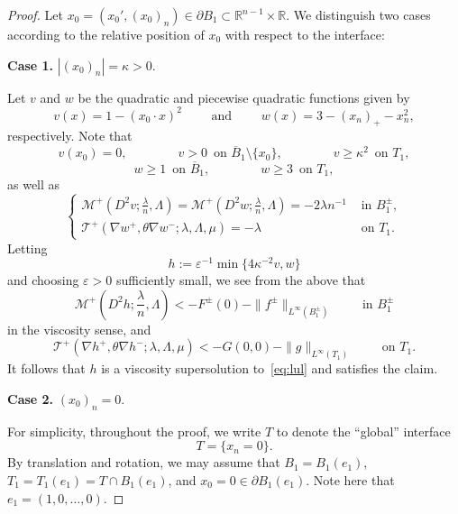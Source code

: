 \documentclass[letter,11pt]{amsart}
\newcommand{\R}{\mathbb{R}}
\newcommand{\vep}{\varepsilon}
\newcommand{\mcal}{\mathcal{M}}
\newcommand{\tcal}{\mathcal{T}}
\theoremstyle{definition}
\numberwithin{equation}{section}
\begin{document}
\begin{proof}
Let $x_0 = (x_0', (x_0)_n) \in \partial B_1 \subset \R^{n-1} \times \R$.
We distinguish two cases according to the relative position of $x_0$ with respect to the interface:

\medskip

\noindent
\textbf{Case 1.} $|(x_0)_n| = \kappa > 0$.

\medskip

Let $v$ and $w$ be the quadratic and piecewise quadratic functions given by
\[
v(x) = 1- (x_0 \cdot x)^2
\qquad \text{ and } 
\qquad w(x) = 3 - (x_n)_{+} - x_n^2,
\]
respectively.
Note that 
\[
v(x_0) = 0,  
\qquad\qquad v > 0 \, \text{ on } \overline{B}_1 \setminus \{x_0\},  
\qquad\qquad v \geq \kappa^2 \, \text{ on } T_1,
\]
\[
w \geq 1 \, \text{ on } \overline{B}_1, \qquad\qquad w \geq 3 \, \text{ on } T_1,
\]
as well as
\[
\begin{cases}
\textstyle
\mcal^{+}(D^2 v; \frac{\lambda}{n}, \Lambda) 
= \mcal^{+}(D^2 w; \frac{\lambda}{n}, \Lambda)
= - 2 \lambda n^{-1} & \text{ in } B_1^{\pm},\\
\tcal^{+}(\nabla w^{+}, \theta \nabla w^{-}; \lambda, \Lambda, \mu)
= - \lambda & \text{ on } T_1.
\end{cases}
\]
Letting
\[
h := \vep^{-1}\min\big\{4 \kappa^{-2} v, w\big\}
\]
and choosing $\vep >0$ sufficiently small, we see from the above that
\begin{equation}
\label{an1}
\textstyle
\mcal^{+}(D^2 h; \frac{\lambda}{n}, \Lambda) 
< - F^{\pm}(0) - \|f^{\pm}\|_{L^{\infty}(B_1^{\pm})} \qquad \text{ in } B_1^{\pm}
\end{equation}
in the viscosity sense, and
\begin{equation}
\label{an2}
\tcal^{+}(\nabla h^{+}, \theta \nabla h^{-}; \lambda, \Lambda, \mu) 
< - G(0,0) - \|g\|_{L^{\infty}(T_1)} \qquad \text{ on } T_1.
\end{equation}
It follows that 
$h$ is a viscosity supersolution to~\eqref{eq:lul} and satisfies the claim.

\medskip

\noindent
\textbf{Case 2.} $(x_0)_n = 0$.

\medskip

For simplicity, throughout the proof, we write $T$ to denote
the ``global'' interface
\[
T = \{x_n = 0\}.
\]
By translation and rotation, we may assume that $B_1 = B_1(e_1)$, $T_1 = T_1(e_1) = T \cap B_1(e_1)$, and $x_0 = 0 \in \partial B_1(e_1)$.
Note here that $e_1 = (1, 0, \ldots, 0)$.


\end{proof}
\end{document}
